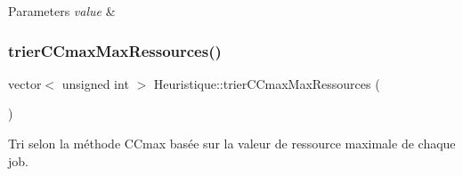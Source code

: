 \begin{DoxyParams}{Parameters}
{\em value} & \\
\hline
\end{DoxyParams}
\mbox{\label{classHeuristique_a02aae5127f941e55311e8bbd3b4afd3c}} 
\subsubsection{\texorpdfstring{trier\+C\+Cmax\+Max\+Ressources()}{trierCCmaxMaxRessources()}}
{\footnotesize\ttfamily vector$<$ unsigned int $>$ Heuristique\+::trier\+C\+Cmax\+Max\+Ressources (\begin{DoxyParamCaption}{ }\end{DoxyParamCaption})}



Tri selon la méthode C\+Cmax basée sur la valeur de ressource maximale de chaque job. 

